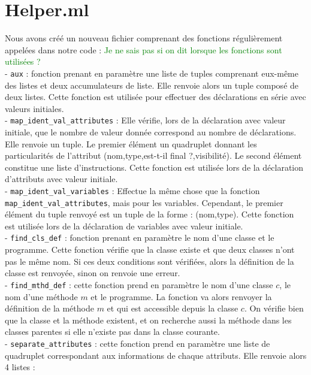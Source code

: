 \documentclass{article}
\begin{document}
\section{Helper.ml}
Nous avons créé un nouveau fichier comprenant des fonctions régulièrement appelées dans notre code : 
\textcolor{green}{Je ne sais pas si on dit lorsque les fonctions sont utilisées ?}
\smallskip\\
- \texttt{aux} : fonction prenant en paramètre une liste de tuples comprenant eux-même des listes et deux accumulateurs de liste. Elle renvoie alors un tuple composé de deux listes. Cette fonction est utilisée pour effectuer des déclarations en série avec valeurs initiales.
\medskip\\
- \texttt{map\_ident\_val\_attributes} : Elle vérifie, lors de la déclaration avec valeur initiale, que le nombre de valeur donnée correspond au nombre de déclarations. Elle renvoie un tuple. Le premier élément un quadruplet donnant les particularités de l'attribut (nom,type,est-t-il final ?,visibilité). Le second élément constitue une liste d'instructions. Cette fonction est utilisée lors de la déclaration d'attributs avec valeur initiale. 
\medskip\\
- \texttt{map\_ident\_val\_variables} : Effectue la même chose que la fonction \texttt{map\_ident\_val\_attributes}, mais pour les variables. Cependant, le premier élément du tuple renvoyé est un tuple de la forme : (nom,type). Cette fonction est utilisée lors de la déclaration de variables avec valeur initiale. \\
- \texttt{find\_cls\_def} : fonction prenant en paramètre le nom d'une classe et le programme. Cette fonction vérifie que la classe existe et que deux classes n'ont pas le même nom. Si ces deux conditions sont vérifiées, alors la définition de la classe est renvoyée, sinon on renvoie une erreur. 
\medskip\\
- \texttt{find\_mthd\_def} : cette fonction prend en paramètre le nom d'une classe $c$, le nom d'une méthode $m$ et le programme. La fonction va alors renvoyer la définition de la méthode $m$ et qui est accessible depuis la classe $c$. On vérifie bien que la classe et la méthode existent, et on recherche aussi la méthode dans les classes parentes si elle n'existe pas dans la classe courante.
\medskip\\
- \texttt{separate\_attributes} : cette fonction prend en paramètre une liste de quadruplet correspondant aux informations de chaque attributs. Elle renvoie alors 4 listes : \\
\end{document}
